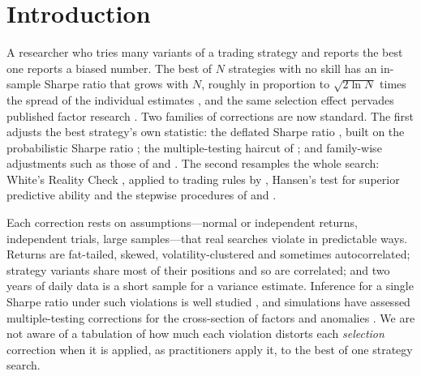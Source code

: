 \section{Introduction}
\label{sec:intro}

A researcher who tries many variants of a trading strategy and reports the best one reports a biased number. The best of $N$ strategies with no skill has an in-sample Sharpe ratio that grows with $N$, roughly in proportion to $\sqrt{2\ln N}$ times the spread of the individual estimates \citep{bailey2014pseudo}, and the same selection effect pervades published factor research \citep{harvey2016cross}. Two families of corrections are now standard. The first adjusts the best strategy's own statistic: the deflated Sharpe ratio \citep{bailey2014dsr}, built on the probabilistic Sharpe ratio \citep{bailey2012frontier}; the multiple-testing haircut of \citet{harvey2015backtesting}; and family-wise adjustments such as those of \citet{holm1979} and \citet{sidak1967}. The second resamples the whole search: White's Reality Check \citep{white2000reality}, applied to trading rules by \citet{sullivan1999datasnooping}, Hansen's test for superior predictive ability \citep{hansen2005spa} and the stepwise procedures of \citet{romano2005stepwise} and \citet{hsu2010stepwise}.

Each correction rests on assumptions---normal or independent returns, independent trials, large samples---that real searches violate in predictable ways. Returns are fat-tailed, skewed, volatility-clustered and sometimes autocorrelated; strategy variants share most of their positions and so are correlated; and two years of daily data is a short sample for a variance estimate. Inference for a single Sharpe ratio under such violations is well studied \citep{lo2002sharpe,opdyke2007comparing,ledoit2008robust}, and simulations have assessed multiple-testing corrections for the cross-section of factors and anomalies \citep{harvey2020false,chordia2020anomalies}. We are not aware of a tabulation of how much each violation distorts each \emph{selection} correction when it is applied, as practitioners apply it, to the best of one strategy search.

